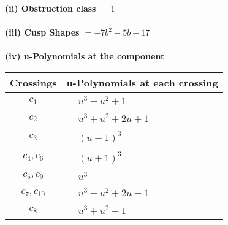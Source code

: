 \documentclass[1p]{elsarticle_modified}
\theoremstyle{definition}
\begin{document}
\flushleft \textbf{(ii) Obstruction class $= 1$}\\~\\
\flushleft \textbf{(iii) Cusp Shapes $= -7 b^2-5 b-17$}\\~\\
\newpage\renewcommand{\arraystretch}{1}
\flushleft \textbf{(iv) u-Polynomials at the component}\newline \\
\begin{tabular}{m{50pt}|m{274pt}}
Crossings & \hspace{64pt}u-Polynomials at each crossing \\
\hline $$\begin{aligned}c_{1}\end{aligned}$$&$\begin{aligned}
&u^3- u^2+1
\end{aligned}$\\
\hline $$\begin{aligned}c_{2}\end{aligned}$$&$\begin{aligned}
&u^3+u^2+2 u+1
\end{aligned}$\\
\hline $$\begin{aligned}c_{3}\end{aligned}$$&$\begin{aligned}
&(u-1)^3
\end{aligned}$\\
\hline $$\begin{aligned}c_{4},c_{6}\end{aligned}$$&$\begin{aligned}
&(u+1)^3
\end{aligned}$\\
\hline $$\begin{aligned}c_{5},c_{9}\end{aligned}$$&$\begin{aligned}
&u^3
\end{aligned}$\\
\hline $$\begin{aligned}c_{7},c_{10}\end{aligned}$$&$\begin{aligned}
&u^3- u^2+2 u-1
\end{aligned}$\\
\hline $$\begin{aligned}c_{8}\end{aligned}$$&$\begin{aligned}
&u^3+u^2-1
\end{aligned}$\\
\hline
\end{tabular}\\~\\
\end{document}
